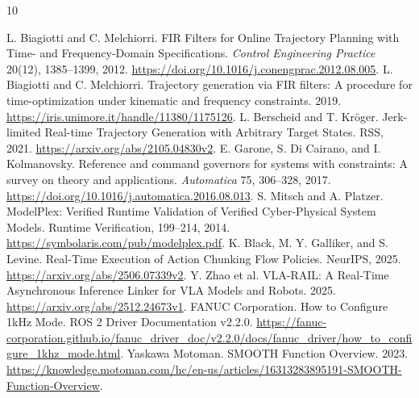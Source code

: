 \documentclass[10pt,letterpaper]{article}
\begin{document}
\begin{thebibliography}{10}\small\raggedright
{} L. Biagiotti and C. Melchiorri.
FIR Filters for Online Trajectory Planning with Time- and Frequency-Domain
Specifications. \emph{Control Engineering Practice} 20(12), 1385--1399, 2012.
\url{https://doi.org/10.1016/j.conengprac.2012.08.005}.
 L. Biagiotti and C. Melchiorri.
Trajectory generation via FIR filters: A procedure for time-optimization under
kinematic and frequency constraints. 2019.
\url{https://iris.unimore.it/handle/11380/1175126}.
 L. Berscheid and T. Kr\"oger.
Jerk-limited Real-time Trajectory Generation with Arbitrary Target States.
RSS, 2021. \url{https://arxiv.org/abs/2105.04830v2}.
 E. Garone, S. Di Cairano, and I. Kolmanovsky.
Reference and command governors for systems with constraints: A survey on
theory and applications. \emph{Automatica} 75, 306--328, 2017.
\url{https://doi.org/10.1016/j.automatica.2016.08.013}.
 S. Mitsch and A. Platzer.
ModelPlex: Verified Runtime Validation of Verified Cyber-Physical System Models.
Runtime Verification, 199--214, 2014.
\url{https://symbolaris.com/pub/modelplex.pdf}.
 K. Black, M. Y. Galliker, and S. Levine.
Real-Time Execution of Action Chunking Flow Policies. NeurIPS, 2025.
\url{https://arxiv.org/abs/2506.07339v2}.
 Y. Zhao et al.
VLA-RAIL: A Real-Time Asynchronous Inference Linker for VLA Models and Robots.
2025. \url{https://arxiv.org/abs/2512.24673v1}.
 FANUC Corporation.
How to Configure 1kHz Mode. ROS 2 Driver Documentation v2.2.0.
\url{https://fanuc-corporation.github.io/fanuc_driver_doc/v2.2.0/docs/fanuc_driver/how_to_configure_1khz_mode.html}.
 Yaskawa Motoman.
SMOOTH Function Overview. 2023.
\url{https://knowledge.motoman.com/hc/en-us/articles/16313283895191-SMOOTH-Function-Overview}.
\end{thebibliography}
\end{document}
